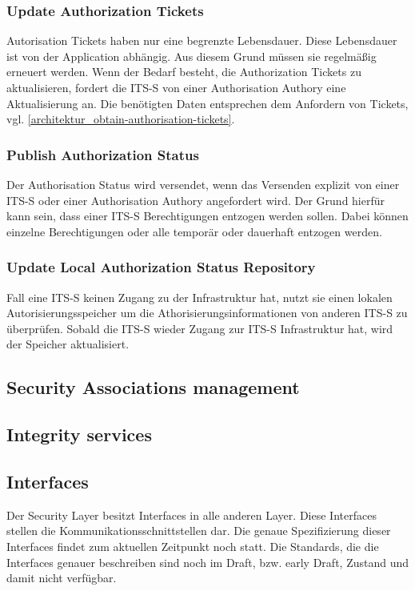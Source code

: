 \subsubsection{Update Authorization Tickets}
Autorisation Tickets haben nur eine begrenzte Lebensdauer. Diese Lebensdauer ist von der Application abhängig. Aus diesem Grund müssen sie regelmäßig erneuert werden. Wenn der Bedarf besteht, die Authorization Tickets zu aktualisieren, fordert die \ac{ITS-S} von einer Authorisation Authory eine Aktualisierung an. Die benötigten Daten entsprechen dem Anfordern von Tickets, vgl. \autoref{architektur_obtain-authorisation-tickets}.

\subsubsection{Publish Authorization Status}
Der Authorisation Status wird versendet, wenn das Versenden explizit von einer \ac{ITS-S} oder einer Authorisation Authory angefordert wird. Der Grund hierfür kann sein, dass einer \ac{ITS-S} Berechtigungen entzogen werden sollen. Dabei können einzelne Berechtigungen oder alle temporär oder dauerhaft entzogen werden.

\subsubsection{Update Local Authorization Status Repository}
Fall eine \ac{ITS-S} keinen Zugang zu der Infrastruktur hat, nutzt sie einen lokalen Autorisierungsspeicher um die Athorisierungsinformationen von anderen \ac{ITS-S} zu überprüfen. Sobald die \ac{ITS-S} wieder Zugang zur \ac{ITS-S} Infrastruktur hat, wird der Speicher aktualisiert.  





\subsection{Security Associations management}

\subsection{Integrity services}



\subsection{Interfaces}
Der Security Layer besitzt Interfaces in alle anderen Layer. Diese Interfaces stellen die Kommunikationsschnittstellen dar. Die genaue Spezifizierung dieser Interfaces findet zum aktuellen Zeitpunkt noch statt. Die Standards, die die  Interfaces genauer beschreiben sind noch im  \glqq Draft\grqq , bzw. \glqq early Draft\grqq , Zustand und damit nicht verfügbar. 

